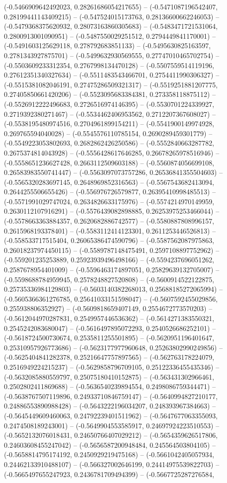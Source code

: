 (-0.5466909642492023, 0.28261686054217655) -- (-0.5471087196542407, 0.28199441143409215) -- (-0.547524015173763, 0.28136600662246053) -- (-0.5479368375620932, 0.28073163860305683) -- (-0.5483471721531064, 0.2800913001090951) -- (-0.5487550029251512, 0.2794449841170001) -- (-0.5491603125629118, 0.278792683851133) -- (-0.5495630825163597, 0.2781343927875701) -- (-0.5499632930569555, 0.27747010465702754) -- (-0.5503609233312354, 0.2767998134470128) -- (-0.5507559514119196, 0.27612351340327634) -- (-0.5511483543466701, 0.2754411990306327) -- (-0.5515381082046191, 0.27475286509321317) -- (-0.5519251881207775, 0.27405850661420206) -- (-0.5523095683384381, 0.273358118875112) -- (-0.5526912222496683, 0.2726516974146395) -- (-0.5530701224339927, 0.2719392380271467) -- (-0.5534462406953562, 0.2712207367608027) -- (-0.5538195480974516, 0.2704961899154211) -- (-0.5541900149974928, 0.269765594040028) -- (-0.5545576110785154, 0.2690289459301779) -- (-0.5549223053802693, 0.2682862426250586) -- (-0.5552840663287782, 0.2675374814043928) -- (-0.5556428617646285, 0.26678265978516946) -- (-0.5558651236627428, 0.2663112509603188) -- (-0.5560874056699108, 0.26583983550741447) -- (-0.5563097073757286, 0.26536841355504603) -- (-0.5565320283697145, 0.2648969852316563) -- (-0.5567543682413094, 0.2644255506655426) -- (-0.556976726579877, 0.26395410998485513) -- (-0.5571991029747024, 0.2634826633175976) -- (-0.5574214970149959, 0.2630112107916291) -- (-0.5576439082898885, 0.26253975253466044) -- (-0.5578663363884357, 0.2620682886742577) -- (-0.5580887808996157, 0.2615968193378401) -- (-0.5583112414123301, 0.2611253446526813) -- (-0.558533717515404, 0.26065386474590796) -- (-0.5587562087975863, 0.26018237974450115) -- (-0.5589787148475491, 0.2597108897752962) -- (-0.559201235253889, 0.25923939496498166) -- (-0.5594237696051262, 0.2587678954401009) -- (-0.5596463174897051, 0.25829639132705007) -- (-0.5598688784959945, 0.2578248827520808) -- (-0.5600914522122875, 0.25735336984129803) -- (-0.5603140382268013, 0.25688185272065994) -- (-0.5605366361276785, 0.25641033151598047) -- (-0.5607592455029856, 0.255938806352927) -- (-0.5609818659407149, 0.2554672773570203) -- (-0.5612044970287831, 0.2549957446536362) -- (-0.5614271383550321, 0.2545242083680047) -- (-0.5616497895072293, 0.2540526686252101) -- (-0.5618724500730674, 0.2535811255501895) -- (-0.5620951196401647, 0.25310957926773686) -- (-0.5623177977960648, 0.25263802990249856) -- (-0.5625404841282378, 0.25216647757897565) -- (-0.562763178224079, 0.2516949224215237) -- (-0.5629858796709105, 0.25122336455435346) -- (-0.5632085880559797, 0.25075180410152875) -- (-0.563431302966461, 0.2502802411869688) -- (-0.5636540239894554, 0.2498086759344471) -- (-0.5638767507119896, 0.24933710846759147) -- (-0.5640994827210177, 0.24886553890988428) -- (-0.5643222196034207, 0.248393967384663) -- (-0.5645449609460063, 0.24792239401511962) -- (-0.5647677063355093, 0.2474508189243001) -- (-0.5649904553585917, 0.24697924223510553) -- (-0.5652132076018431, 0.24650766407029212) -- (-0.5654359626517806, 0.24603608455247042) -- (-0.5656587200948484, 0.245564503804105) -- (-0.5658814795174192, 0.2450929219475168) -- (-0.5661042405057934, 0.24462133910488107) -- (-0.566327002646199, 0.24414975539822703) -- (-0.5665497655247923, 0.2436781709494399) -- (-0.5667725287276584, 
